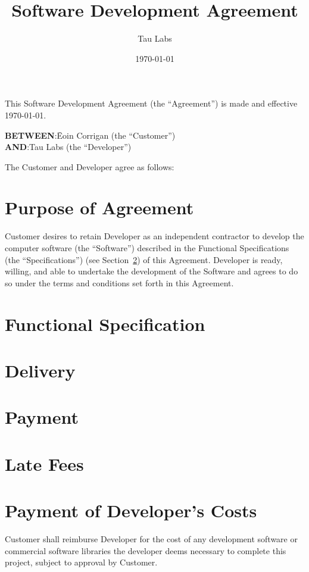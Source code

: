 \documentclass{article}
\begin{document}
\title{Software Development Agreement}
\author{Tau Labs}
\date{\today}
\maketitle
\section*{}
This Software Development Agreement (the “Agreement”) is made and effective {\today}.
\begin{tabbing}
{\bf BETWEEN}:\hspace{0.2in}\=Eoin Corrigan (the ``Customer'') \\
{\bf AND}:\>Tau Labs (the ``Developer'') 
\end{tabbing}
The Customer and Developer agree as follows:
\section{Purpose of Agreement}
Customer desires to retain Developer as an independent contractor to develop the computer software (the “Software”) described in the Functional Specifications (the “Specifications”) (see Section~\ref{sec:functionalspec}) of this Agreement. Developer is ready, willing, and able to undertake the development of the Software and agrees to do so under the terms and conditions set forth in this Agreement.
\section{Functional Specification}
\label{sec:functionalspec}
\section{Delivery}
\section{Payment}	
\section{Late Fees}
\section{Payment of Developer’s Costs}
Customer shall reimburse Developer for the cost of any development software or commercial software libraries the developer deems necessary to complete this project, subject to approval by Customer.
\end{document}

